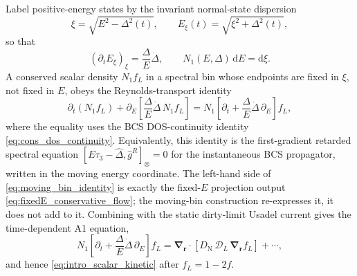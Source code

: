 \documentclass[
  aps,
  prb,
  preprint,
  superscriptaddress,
  longbibliography,
  nofootinbib
]{revtex4-2}
\newcommand{\dd}{\mathrm{d}}
\newcommand{\br}{\mathbf{r}}
\newcommand{\bnabla}{\boldsymbol{\nabla}}
\newcommand{\DOS}{N_1}
\newcommand{\DN}{D_{\mathrm{N}}}
\newcommand{\fL}{f_L}
\begin{document}
Label positive-energy states by the invariant normal-state
dispersion
\begin{equation}
  \xi=\sqrt{E^2-\Delta^2(t)},\qquad
  E_\xi(t)=\sqrt{\xi^2+\Delta^2(t)} ,
  \label{eq:xi_energy_shell}
\end{equation}
so that
\begin{equation}
  \left(\partial_t E_\xi\right)_\xi
  =
  \frac{\Delta}{E}\dot\Delta,
  \qquad
  \DOS(E,\Delta)\,\dd E=\dd\xi .
  \label{eq:energy_shell_jacobian}
\end{equation}
A conserved scalar density \(\DOS\fL\) in a spectral bin whose endpoints are
fixed in \(\xi\), not fixed in \(E\), obeys the Reynolds-transport identity
\begin{equation}
  \partial_t(\DOS\fL)
  +
  \partial_E\!\left[
    \frac{\Delta}{E}\dot\Delta\,\DOS\fL
  \right]
  =
  \DOS\left[
    \partial_t+\frac{\Delta}{E}\dot\Delta\,\partial_E
  \right]\fL ,
  \label{eq:moving_bin_identity}
\end{equation}
where the equality uses the BCS DOS-continuity identity
\cref{eq:cons_dos_continuity}. Equivalently, this identity is the
first-gradient retarded spectral equation
\([E\tau_3-\hat\Delta,\hat g^R]_{\otimes}=0\) for the instantaneous BCS propagator,
written in the moving energy coordinate. The left-hand side of
\cref{eq:moving_bin_identity} is exactly the fixed-\(E\) projection
output \cref{eq:fixedE_conservative_flow}; the moving-bin construction
re-expresses it, it does not add to it. Combining with the static
dirty-limit Usadel current gives the time-dependent A1 equation,
\begin{equation}
  \DOS
  \left[
    \partial_t+\frac{\Delta}{E}\dot\Delta\,\partial_E
  \right]\fL
  =
  \bnabla_{\br}\cdot
  \left[\DN\,\mathcal{D}_L\,\bnabla_{\br}\fL\right]
  +\cdots ,
  \label{eq:usadel_A1_tdep_fL}
\end{equation}
and hence \cref{eq:intro_scalar_kinetic} after
\(\fL=1-2f\).
\end{document}
